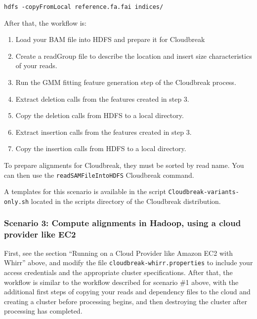 \documentclass[11pt]{article}
\begin{document}
\begin{verbatim}
hdfs -copyFromLocal reference.fa.fai indices/
\end{verbatim}

After that, the workflow is:

\begin{enumerate}
\item Load your BAM file into HDFS and prepare it for Cloudbreak

\item Create a readGroup file to describe the location and insert size characteristics of your reads.

\item Run the GMM fitting feature generation step of the Cloudbreak process.

\item Extract deletion calls from the features created in step 3.

\item Copy the deletion calls from HDFS to a local directory.

\item Extract insertion calls from the features created in step 3.

\item Copy the insertion calls from HDFS to a local directory.

\end{enumerate}

To prepare alignments for Cloudbreak, they must be sorted by read name. You can then use the
 \texttt{readSAMFileIntoHDFS} Cloudbreak command.

A templates for this scenario is available in the script \texttt{Cloudbreak-variants-only.sh}
located in the scripts directory of the Cloudbreak distribution.

\subsubsection{Scenario 3: Compute alignments in Hadoop, using a cloud provider like EC2}
\label{scenario3:computealignmentsinhadoopusingacloudproviderlikeec2}

First, see the section ``Running on a Cloud Provider like Amazon EC2 with Whirr'' above, and modify the file
\texttt{cloudbreak-whirr.properties} to include your access credentials and the appropriate cluster
specifications. After that, the workflow is similar to the workflow described for scenario \#1
above, with the additional first steps of copying your reads and dependency files to the cloud and
creating a cluster before processing begins, and then destroying the cluster after processing has
completed.
\end{document}
